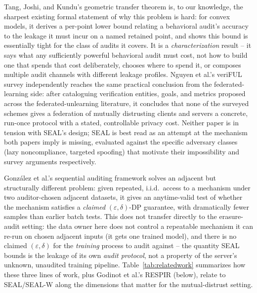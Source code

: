 \documentclass[10pt,journal,compsoc]{IEEEtran}
\begin{document}
Tang, Joshi, and Kundu's geometric transfer theorem \cite{tang2026geometric} is, to our knowledge, the sharpest existing formal statement of why this problem is hard: for convex models, it derives a per-point lower bound relating a behavioral audit's accuracy to the leakage it must incur on a named retained point, and shows this bound is essentially tight for the class of audits it covers. It is a \emph{characterization} result -- it says what any sufficiently powerful behavioral audit must cost, not how to build one that spends that cost deliberately, chooses where to spend it, or composes multiple audit channels with different leakage profiles. Nguyen et al.'s veriFUL survey \cite{nguyen2025veriful} independently reaches the same practical conclusion from the federated-learning side: after cataloguing verification entities, goals, and metrics proposed across the federated-unlearning literature, it concludes that none of the surveyed schemes gives a federation of mutually distrusting clients and servers a concrete, run-once protocol with a stated, controllable privacy cost. Neither paper is in tension with SEAL's design; SEAL is best read as an attempt at the mechanism both papers imply is missing, evaluated against the specific adversary classes (lazy noncompliance, targeted spoofing) that motivate their impossibility and survey arguments respectively.

González et al.'s sequential auditing framework \cite{gonzalez2025sequential} solves an adjacent but structurally different problem: given repeated, i.i.d.\ access to a mechanism under two auditor-chosen adjacent datasets, it gives an anytime-valid test of whether the mechanism satisfies a \emph{claimed} $(\varepsilon,\delta)$-DP guarantee, with dramatically fewer samples than earlier batch tests. This does not transfer directly to the erasure-audit setting: the data owner here does not control a repeatable mechanism it can re-run on chosen adjacent inputs (it gets one trained model), and there is no claimed $(\varepsilon,\delta)$ for the \emph{training} process to audit against -- the quantity SEAL bounds is the leakage of its own \emph{audit protocol}, not a property of the server's unknown, unaudited training pipeline. Table~\ref{tab:relatedwork} summarizes how these three lines of work, plus Godinot et al.'s RESPIR (below), relate to SEAL/SEAL-W along the dimensions that matter for the mutual-distrust setting.
\end{document}
